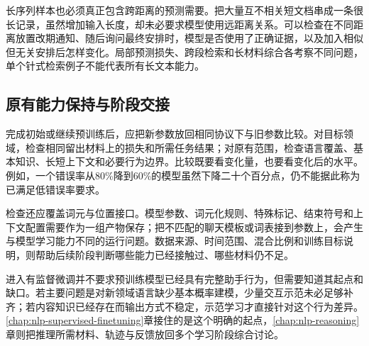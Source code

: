 长序列样本也必须真正包含跨距离的预测需要。把大量互不相关短文档串成一条很长记录，虽然增加输入长度，却未必要求模型使用远距离关系。可以检查在不同距离放置改期通知、随后询问最终安排时，模型是否使用了正确证据，以及加入相似但无关安排后怎样变化。局部预测损失、跨段检索和长材料综合各考察不同问题，单个针式检索例子不能代表所有长文本能力。

\subsection{原有能力保持与阶段交接}
\label{sec:nlp-llm-pretraining-handoff}

完成初始或继续预训练后，应把新参数放回相同协议下与旧参数比较。对目标领域，检查相同留出材料上的损失和所需任务结果；对原有范围，检查语言覆盖、基本知识、长短上下文和必要行为边界。比较既要看变化量，也要看变化后的水平。例如，一个错误率从80\%降到60\%的模型虽然下降二十个百分点，仍不能据此称为已满足低错误率要求。

检查还应覆盖词元与位置接口。模型参数、词元化规则、特殊标记、结束符号和上下文配置需要作为一组产物保存；把不匹配的聊天模板或词表接到参数上，会产生与模型学习能力不同的运行问题。数据来源、时间范围、混合比例和训练目标说明，则帮助后续阶段判断哪些能力已经接触过、哪些材料仍不足。

进入有监督微调并不要求预训练模型已经具有完整助手行为，但需要知道其起点和缺口。若主要问题是对新领域语言缺少基本概率建模，少量交互示范未必足够补齐；若内容知识已经存在而输出方式不稳定，示范学习才直接针对这个行为差异。\ref{chap:nlp-supervised-finetuning}章接住的是这个明确的起点，\ref{chap:nlp-reasoning}章则把推理所需材料、轨迹与反馈放回多个学习阶段综合讨论。

